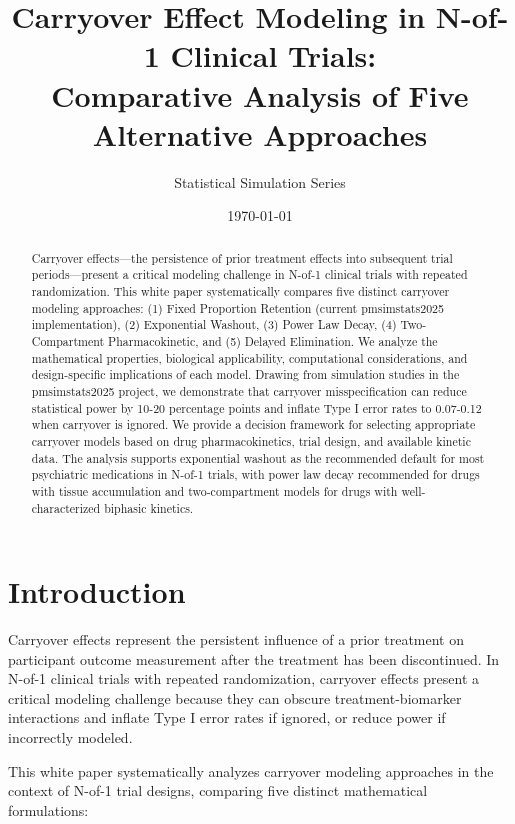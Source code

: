 \documentclass[11pt,a4paper]{article}
\title{Carryover Effect Modeling in N-of-1 Clinical Trials:\\[0.5em]
  \normalsize Comparative Analysis of Five Alternative Approaches}
\author{Statistical Simulation Series}
\date{\today}
\begin{document}
\maketitle

\begin{abstract}
\noindent
Carryover effects—the persistence of prior treatment effects into subsequent trial periods—present a critical modeling challenge in N-of-1 clinical trials with repeated randomization. This white paper systematically compares five distinct carryover modeling approaches: (1) Fixed Proportion Retention (current pmsimstats2025 implementation), (2) Exponential Washout, (3) Power Law Decay, (4) Two-Compartment Pharmacokinetic, and (5) Delayed Elimination. We analyze the mathematical properties, biological applicability, computational considerations, and design-specific implications of each model. Drawing from simulation studies in the pmsimstats2025 project, we demonstrate that carryover misspecification can reduce statistical power by 10-20 percentage points and inflate Type I error rates to 0.07-0.12 when carryover is ignored. We provide a decision framework for selecting appropriate carryover models based on drug pharmacokinetics, trial design, and available kinetic data. The analysis supports exponential washout as the recommended default for most psychiatric medications in N-of-1 trials, with power law decay recommended for drugs with tissue accumulation and two-compartment models for drugs with well-characterized biphasic kinetics.
\end{abstract}

\newpage

\tableofcontents

\newpage

\section{Introduction}
\label{sec:intro}

Carryover effects represent the persistent influence of a prior treatment on participant outcome measurement after the treatment has been discontinued. In N-of-1 clinical trials with repeated randomization, carryover effects present a critical modeling challenge because they can obscure treatment-biomarker interactions and inflate Type I error rates if ignored, or reduce power if incorrectly modeled.

This white paper systematically analyzes carryover modeling approaches in the context of N-of-1 trial designs, comparing five distinct mathematical formulations:
\end{document}
